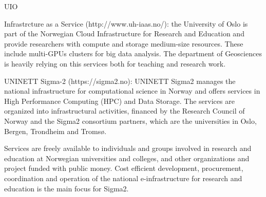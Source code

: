 \begin{sitedescription}{UIO}
\begin{compactenum}

\item Infrastrcture as a Service (http://www.uh-iaas.no/): the University of Oslo is part of the Norwegian Cloud Infrastructure for Research and Education and provide researchers with compute and storage medium-size resources. These include multi-GPUs clusters for big data analysis. The department of Geosciences is heavily relying on this services both for teaching and research work.

\item UNINETT Sigma-2 (https://sigma2.no): UNINETT Sigma2 manages the national infrastructure for computational science in Norway and offers services in High Performance Computing (HPC) and Data Storage. The services are organized into infrastructural activities, financed by the Research Council of Norway and the Sigma2 consortium partners, which are the universities in Oslo, Bergen, Trondheim and Tromsø.

Services are freely available to individuals and groups involved in  research and education at Norwegian universities and colleges, and other organizations and project funded with public money. Cost efficient development, procurement, coordination and operation of the national e-infrastructure for research and education is the main focus for Sigma2.
\end{compactenum}

\end{sitedescription}

